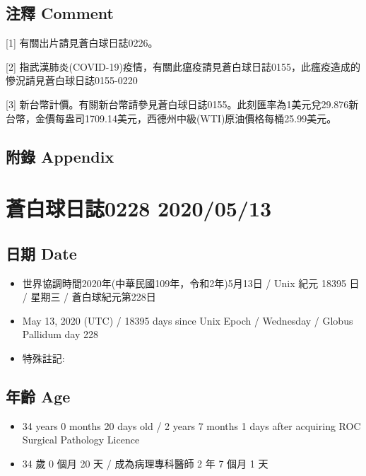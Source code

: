 \documentclass[a5paper, 11pt
]{book}
\providecommand{\tightlist}{%
  \setlength{\itemsep}{0pt}\setlength{\parskip}{0pt}}
\begin{document}
\hypertarget{ux6ce8ux91cb-comment-72}{%
\subsection{注釋 Comment}\label{ux6ce8ux91cb-comment-72}}

{[}1{]} 有關出片請見蒼白球日誌0226。

{[}2{]}
指武漢肺炎(COVID-19)疫情，有關此瘟疫請見蒼白球日誌0155，此瘟疫造成的慘況請見蒼白球日誌0155-0220

{[}3{]}
新台幣計價。有關新台幣請參見蒼白球日誌0155。此刻匯率為1美元兌29.876新台幣，金價每盎司1709.14美元，西德州中級(WTI)原油價格每桶25.99美元。

\hypertarget{ux9644ux9304-appendix-72}{%
\subsection{附錄 Appendix}\label{ux9644ux9304-appendix-72}}

\hypertarget{ux84bcux767dux7403ux65e5ux8a8c0228-20200513}{%
\section{蒼白球日誌0228
2020/05/13}\label{ux84bcux767dux7403ux65e5ux8a8c0228-20200513}}

\hypertarget{ux65e5ux671f-date-73}{%
\subsection{日期 Date}\label{ux65e5ux671f-date-73}}

\begin{itemize}
\tightlist
\item
  世界協調時間2020年(中華民國109年，令和2年)5月13日 / Unix 紀元 18395 日
  / 星期三 / 蒼白球紀元第228日
\item
  May 13, 2020 (UTC) / 18395 days since Unix Epoch / Wednesday / Globus
  Pallidum day 228
\item
  特殊註記:
\end{itemize}

\hypertarget{ux5e74ux9f61-age-73}{%
\subsection{年齡 Age}\label{ux5e74ux9f61-age-73}}

\begin{itemize}
\tightlist
\item
  34 years 0 months 20 days old / 2 years 7 months 1 days after
  acquiring ROC Surgical Pathology Licence
\item
  34 歲 0 個月 20 天 / 成為病理專科醫師 2 年 7 個月 1 天
\end{itemize}
\end{document}
